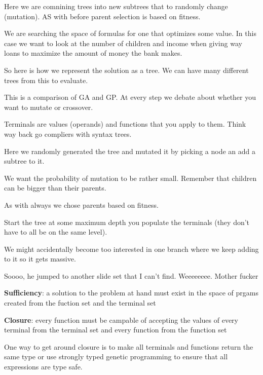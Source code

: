 \documentclass[12pt]{article}
\begin{document}

Here we are comnining trees into new subtrees that to randomly change (mutation). AS with before parent selection is based on fitness.



We are searching the space of formulas for one that optimizes some value. In this case we want to look at the number of children and income when giving way loans to maximize the amount of money the bank makes. 


So here is how we represent the solution as a tree. We can have many different trees from this to evaluate.





This is a comparison of GA and GP. At every step we debate about whether you want to mutate or crossover.


Terminals are values (operands) and functions that you apply to them. Think way back go compliers with syntax trees.
 


Here we randomly generated the tree and mutated it by picking a node an add a subtree to it.


We want the probability of mutation to be rather small. Remember that children can be bigger than their parents.



As with always we chose parents based on fitness. 


Start the tree at some maximum depth you populate the terminals (they don't have to all be on the same level).


We might accidentally become too interested in one branch where we keep adding to it so it gets  massive. 



Soooo, he jumped to another slide set that I can't find. Weeeeeeee. Mother fucker

\textbf{Sufficiency}: a solution to the problem at hand must exist in the space of prgams created from the fuction set and the terminal set

\textbf{Closure}: every function must be campable of accepting the values of every terminal from the terminal set and every function from the function set

One way to get around closure is to make all terminals and functions return the same type or use strongly typed genetic programming to ensure that all expressions are type safe.
\end{document}
